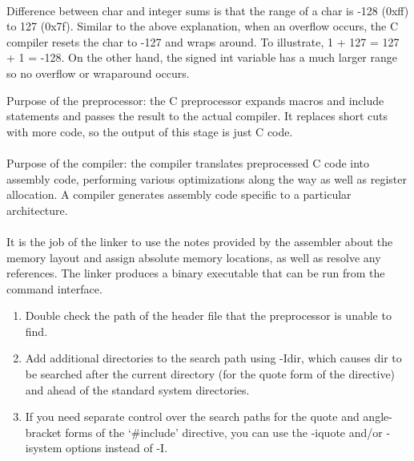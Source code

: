 \documentclass[
  course = {{ESE532 System-on-a-Chip}},
  quartile = {{}},
  assignment = 1,
  name = {{Sheil Sarda}},
  studentnumber = {{}},
  email = {{sheils@seas.upenn.edu}},
  firstexercise = 1
]{aga-homework}
\begin{document}
\paragraph{}
Difference between char and integer sums is that the range of a char is -128 (0xff) to 127 (0x7f). Similar to the above explanation, when an overflow occurs, the C compiler resets the char to -127 and wraps around. To illustrate, 1 + 127 = 127 + 1 = -128. On the other hand, the signed int variable has a much larger range so no overflow or wraparound occurs.

\subexercise
Purpose of the preprocessor: the C preprocessor expands macros and include statements and passes the result to the actual compiler. It replaces short cuts with more code, so the output of this stage is just C code.

\paragraph{}
Purpose of the compiler: the compiler translates preprocessed C code into assembly code, performing various optimizations along the way as well as register allocation. A compiler generates assembly code specific to a particular architecture.

\paragraph{}
It is the job of the linker to use the notes provided by the assembler about the memory layout and assign absolute memory locations, as well as resolve any references. The linker produces a binary executable that can be run from the command interface.

\subexercise
\renewcommand{\theenumi}{\roman{enumi}}%
\begin{enumerate}
	\item Double check the path of the header file that the preprocessor is unable to find.

	\item 	Add additional directories to the search path using -Idir, which causes dir to be searched after the current directory (for the quote form of the directive) and ahead of the standard system directories. 
	
	\item	If you need separate control over the search paths for the quote and angle-bracket forms of the ‘\#include’ directive, you can use the -iquote and/or -isystem options instead of -I. 	

\end{enumerate}
\end{document}
